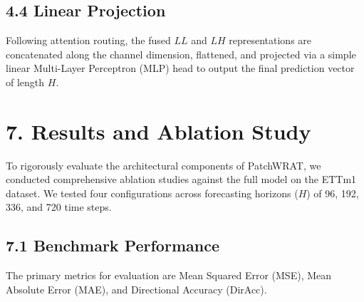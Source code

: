 \documentclass[11pt, letterpaper]{article}
\begin{document}
\subsection{4.4 Linear Projection}
Following attention routing, the fused $LL$ and $LH$ representations are concatenated along the channel dimension, flattened, and projected via a simple linear Multi-Layer Perceptron (MLP) head to output the final prediction vector of length $H$.



\section{7. Results and Ablation Study}
\label{sec:results}

To rigorously evaluate the architectural components of PatchWRAT, we conducted comprehensive ablation studies against the full model on the ETTm1 dataset. We tested four configurations across forecasting horizons ($H$) of 96, 192, 336, and 720 time steps. 

\subsection{7.1 Benchmark Performance}
The primary metrics for evaluation are Mean Squared Error (MSE), Mean Absolute Error (MAE), and Directional Accuracy (DirAcc). 
\end{document}
